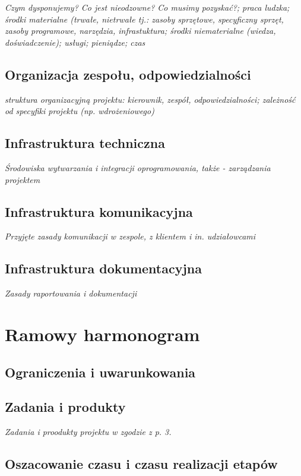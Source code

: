 \documentclass[11pt,oneside,a4paper,titlepage,onecolumn]{article}
\begin{document}
\emph{Czym dysponujemy? Co jest nieodzowne? Co musimy pozyskać?; praca ludzka; środki materialne (trwałe, nietrwałe tj.: zasoby sprzętowe, specyficzny sprzęt, zasoby programowe, narzędzia, infrastuktura; środki niematerialne (wiedza, doświadczenie); usługi; pieniądze; czas}

\subsection{Organizacja zespołu, odpowiedzialności}

\emph{struktura organizacyjną projektu: kierownik, zespół, odpowiedzialności; zależność od specyfiki projektu (np. wdrożeniowego)}

\subsection{Infrastruktura techniczna}

\emph{Środowiska wytwarzania i integracji oprogramowania, także - zarządzania projektem}

\subsection{Infrastruktura komunikacyjna}

\emph{Przyjęte zasady komunikacji w zespole, z klientem i in. udziałowcami}

\subsection{Infrastruktura dokumentacyjna}

\emph{Zasady raportowania i dokumentacji}

\section{Ramowy harmonogram}

\subsection{Ograniczenia i uwarunkowania}

\subsection{Zadania i produkty}

\emph{Zadania i proodukty projektu w zgodzie z p. 3.}

\subsection{Oszacowanie czasu i czasu realizacji etapów}
\end{document}
